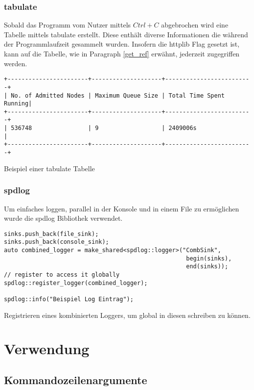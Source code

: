 \documentclass[12pt, letterpaper]{article}
\newenvironment{code}{\captionsetup{type=listing}}{}
\begin{document}
\subsubsection{tabulate}
Sobald das Programm vom Nutzer mittels $Ctrl+C$ abgebrochen wird eine Tabelle mittels tabulate\cite{tabulate-ref} erstellt. Diese enthält diverse Informationen die während der Programmlaufzeit gesammelt wurden.
Insofern die httplib Flag gesetzt ist, kann auf die Tabelle, wie in Paragraph \ref{get_ref} erwähnt, jederzeit zugegriffen werden.

\begin{code}
\begin{verbatim}
+-----------------------+--------------------+-------------------------+
| No. of Admitted Nodes | Maximum Queue Size | Total Time Spent Running|
+-----------------------+--------------------+-------------------------+
| 536748                | 9                  | 2409006s                |
+-----------------------+--------------------+-------------------------+
\end{verbatim}
\caption{Beispiel einer tabulate Tabelle}
\end{code}
    
\subsubsection{spdlog}
Um einfaches loggen, parallel in der Konsole und in einem File zu ermöglichen wurde die spdlog\cite{spdlog_ref} Bibliothek verwendet. 
\begin{code}
\begin{verbatim}
sinks.push_back(file_sink);
sinks.push_back(console_sink);
auto combined_logger = make_shared<spdlog::logger>("CombSink", 
                                                    begin(sinks), 
                                                    end(sinks));
// register to access it globally
spdlog::register_logger(combined_logger);

spdlog::info("Beispiel Log Eintrag");
\end{verbatim}
\caption{Registrieren eines kombinierten Loggers, um global in diesen schreiben zu können.}
\end{code}

\section{Verwendung}
\label{usage}

\subsection{Kommandozeilenargumente}
\end{document}
